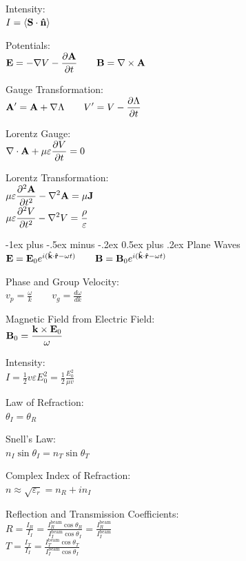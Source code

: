 \documentclass[12pt,landscape]{article}
\makeatletter
\renewcommand{\section}{\@startsection{section}{1}{0mm}%
                                {-1ex plus -.5ex minus -.2ex}%
                                {0.5ex plus .2ex}%
                                {\normalfont\normalsize\bfseries}}
\newcommand{\tab}{\hspace{.02\textwidth}}
\newcommand{\ds}{\displaystyle}
\renewcommand{\dv}[2]{\frac{d#1}{d#2}}
\renewcommand{\grad}{\nabla}
\renewcommand{\curl}[1]{\nabla\times#1}
\renewcommand{\div}[1]{\nabla\cdot#1}
\renewcommand{\cross}{\times}
\makeatother
\begin{document}
\begin{multicols}{3}
Intensity:\\
\tab $I = \langle \vb{S}\cdot\vu{n}\rangle$

Potentials:\\
\tab $\ds \vb{E} = -\grad{V} - \pdv{\vb{A}}{t} \qquad \vb{B} = \curl{\vb{A}}$

Gauge Transformation:\\
\tab $\ds \vb{A^\prime} = \vb{A} + \grad{\Lambda} \qquad V^\prime = V - \pdv{\Lambda}{t}$

Lorentz Gauge:\\
\tab $\ds \div{\vb{A}} + \mu\varepsilon\pdv{V}{t} = 0$

Lorentz Transformation:\\
\tab $\ds \mu\varepsilon\pdv[2]{\vb{A}}{t} - \laplacian{\vb{A}} = \mu\vb{J}$\\
\tab $\ds \mu\varepsilon\pdv[2]{V}{t} - \laplacian{V} = \frac{\rho}{\varepsilon}$

\section{Plane Waves}
$\vb{E} = \vb{E}_0e^{i(\vu{k}\cdot\vu{r} - \omega t)} \qquad \vb{B} = \vb{B}_0e^{i(\vu{k}\cdot\vu{r} - \omega t)}$

Phase and Group Velocity:\\
\tab $\ds v_p = \frac{\omega}{k} \qquad \ds v_g = \dv{\omega}{k}$

\columnbreak

Magnetic Field from Electric Field:\\
\tab $\ds \vb{B}_0 = \frac{\vb{k}\cross\vb{E}_0}{\omega}$

Intensity:\\
\tab $\ds I = \frac{1}{2}v\varepsilon E_0^2 = \frac{1}{2}\frac{E_0^2}{\mu v}$

Law of Refraction:\\
\tab $\theta_I = \theta_R$

Snell's Law:\\
\tab $n_I \sin\theta_I = n_T\sin\theta_T$

Complex Index of Refraction:\\
\tab $\ds n \approx \sqrt{\varepsilon_r} = n_R + in_I$

Reflection and Transmission Coefficients:\\
\tab $\ds R = \frac{I_R}{I_I} = \frac{I^\text{beam}_R\cos\theta_R}{I^\text{beam}_I\cos\theta_I} =\frac{I^\text{beam}_R}{I^\text{beam}_I}$\\
\tab $\ds T = \frac{I_T}{I_I} = \frac{I^\text{beam}_T\cos\theta_T}{I^\text{beam}_I\cos\theta_I}$


\end{multicols}
\end{document}
